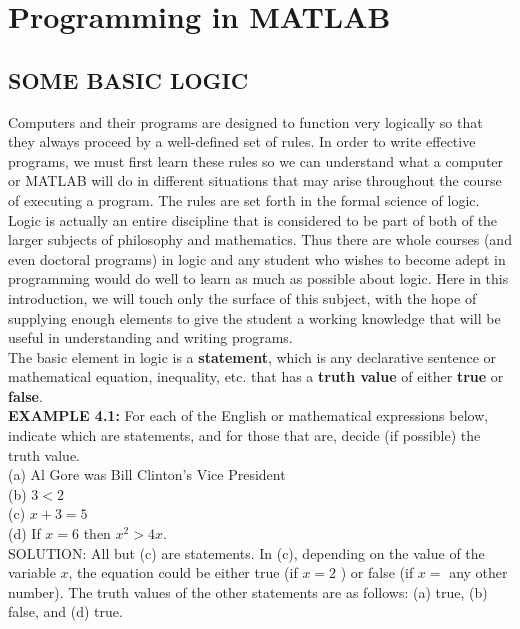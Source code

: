 \documentclass[../main.tex]{subfiles}
\begin{document}
\chapter{Programming in MATLAB}

\section{SOME BASIC LOGIC}

Computers and their programs are designed to function very logically so that they always proceed by a well-defined set of rules. In order to write effective programs, we must first learn these rules so we can understand what a computer or MATLAB will do in different situations that may arise throughout the course of executing a program. The rules are set forth in the formal science of logic. Logic is actually an entire discipline that is considered to be part of both of the larger subjects of philosophy and mathematics. Thus there are whole courses (and even doctoral programs) in logic and any student who wishes to become adept in programming would do well to learn as much as possible about logic. Here in this introduction, we will touch only the surface of this subject, with the hope of supplying enough elements to give the student a working knowledge that will be useful in understanding and writing programs.\\

The basic element in logic is a \textbf{statement}, which is any declarative sentence or mathematical equation, inequality, etc. that has a \textbf{truth value} of either \textbf{true} or \textbf{false}.\\

\textbf{EXAMPLE 4.1:} For each of the English or mathematical expressions below, indicate which are statements, and for those that are, decide (if possible) the truth value.\\
(a) Al  Gore was Bill Clinton's Vice President\\
(b) $3<2$\\
(c) $x+3=5$\\
(d) If $x=6$ then $x^{2}>4 x$.\\

SOLUTION: All but (c) are statements. In (c), depending on the value of the variable $x$, the equation could be either true (if $x=2$ ) or false (if $x=$ any other number). The truth values of the other statements are as follows: (a) true, (b) false, and (d) true.
\end{document}
